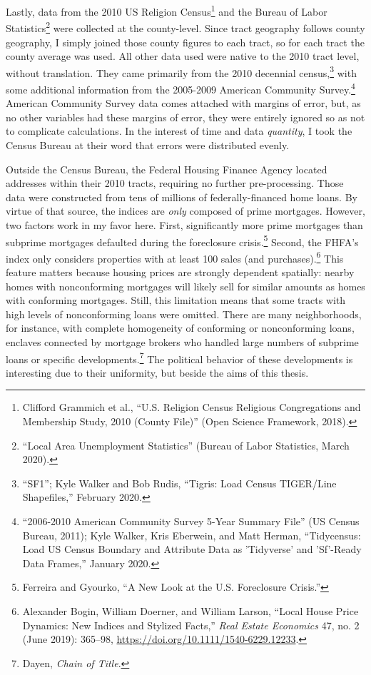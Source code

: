\documentclass[12pt,oneside]{psthesis}
\begin{document}
Lastly, data from the 2010 US Religion Census\footnote{Clifford Grammich et al., ``U.S. Religion Census Religious Congregations and Membership Study, 2010 (County File)'' (Open Science Framework, 2018).} and the Bureau of Labor Statistics\footnote{``Local Area Unemployment Statistics'' (Bureau of Labor Statistics, March 2020).} were collected at the county-level.
Since tract geography follows county geography, I simply joined those county figures to each tract, so for each tract the county average was used.
All other data used were native to the 2010 tract level, without translation.
They came primarily from the 2010 decennial census,\footnote{``SF1''; Kyle Walker and Bob Rudis, ``Tigris: Load Census TIGER/Line Shapefiles,'' February 2020.} with some additional information from the 2005-2009 American Community Survey.\footnote{``2006-2010 American Community Survey 5-Year Summary File'' (US Census Bureau, 2011); Kyle Walker, Kris Eberwein, and Matt Herman, ``Tidycensus: Load US Census Boundary and Attribute Data as 'Tidyverse' and 'Sf'-Ready Data Frames,'' January 2020.}
American Community Survey data comes attached with margins of error, but, as no other variables had these margins of error, they were entirely ignored so as not to complicate calculations.
In the interest of time and data \emph{quantity}, I took the Census Bureau at their word that errors were distributed evenly.

Outside the Census Bureau, the Federal Housing Finance Agency located addresses within their 2010 tracts, requiring no further pre-processing.
Those data were constructed from tens of millions of federally-financed home loans.
By virtue of that source, the indices are \emph{only} composed of prime mortgages.
However, two factors work in my favor here.
First, significantly more prime mortgages than subprime mortgages defaulted during the foreclosure crisis.\footnote{Ferreira and Gyourko, ``A New Look at the U.S. Foreclosure Crisis.''}
Second, the FHFA's index only considers properties with at least 100 sales (and purchases).\footnote{Alexander Bogin, William Doerner, and William Larson, ``Local House Price Dynamics: New Indices and Stylized Facts,'' \emph{Real Estate Economics} 47, no. 2 (June 2019): 365--98, \url{https://doi.org/10.1111/1540-6229.12233}.}
This feature matters because housing prices are strongly dependent spatially: nearby homes with nonconforming mortgages will likely sell for similar amounts as homes with conforming mortgages.
Still, this limitation means that some tracts with high levels of nonconforming loans were omitted.
There are many neighborhoods, for instance, with complete homogeneity of conforming or nonconforming loans, enclaves connected by mortgage brokers who handled large numbers of subprime loans or specific developments.\footnote{Dayen, \emph{Chain of Title}.}
The political behavior of these developments is interesting due to their uniformity, but beside the aims of this thesis.
\end{document}
